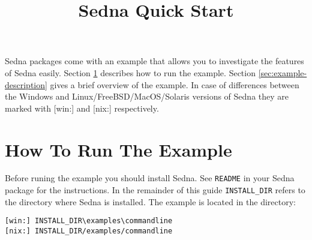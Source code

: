 \documentclass[a4paper,12pt]{article}
\title{Sedna Quick Start}
\date{}
\begin{document}
\sloppy
\maketitle

Sedna packages come with an example that allows you to investigate the features
of Sedna easily. Section \ref{sec:how-to-run} describes how to run the example.
Section \ref{sec:example-description} gives a brief overview of the example. In
case of differences between the Windows and Linux/FreeBSD/MacOS/Solaris versions
of Sedna they are marked with [win:] and [nix:] respectively.

\section{How To Run The Example}
\label{sec:how-to-run}

Before runing the example you should install Sedna. See \verb!README! in your
Sedna package for the instructions. In the remainder of this guide
\verb!INSTALL_DIR! refers to the directory where Sedna is installed. The example
is located in the directory:

\begin{verbatim}
[win:] INSTALL_DIR\examples\commandline
[nix:] INSTALL_DIR/examples/commandline
\end{verbatim}
\end{document}
